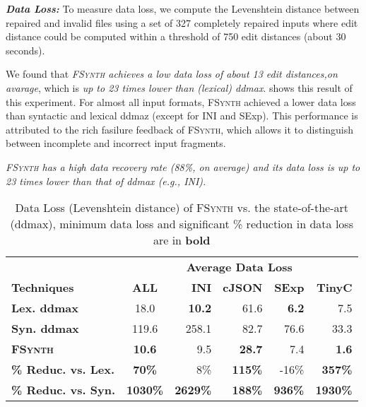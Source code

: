 \documentclass[sigconf,review,anonymous]{acmart}
\newenvironment{result}{\begin{framed}\centering\it}{\end{framed}}
\newcommand{\approach}{\textsc{FSynth}\xspace}
\begin{document}
\noindent
\textbf{\textit{Data Loss:}} To measure data loss, we compute the Levenshtein distance between repaired and invalid files using %
a set of 327 completely repaired inputs %
where edit distance could be computed within a threshold of 750 edit distances (about 30 seconds).

We found that \textit{\approach achieves a low data loss of about 13 edit distances,on avarage},  which is \textit{up to 23 times lower than (lexical) ddmax}.  shows this result of this experiment. For almost all input formats, \approach achieved a lower data loss than syntactic and lexical ddmaz (except for INI and SExp). This performance is attributed to the rich fasilure feedback of \approach, which allows it to distinguish between incomplete and incorrect input fragments.

\begin{result}
\approach has a high data recovery rate (88\%, on average) and its data %
loss is up to 23 times lower than that of ddmax (e.g., INI).
\end{result}


\begin{table}[!tbp]\centering
\caption{Data Loss (Levenshtein distance) of \approach vs. the state-of-the-art (ddmax), minimum data loss and significant \% reduction in data loss are in \textbf{bold}}
\begin{tabular}{|l | c | r  r  r  r |}
\hline
&  \multicolumn{5}{c|}{\textbf{Average Data Loss }}  \\
\textbf{Techniques} & \textbf{ALL} & \textbf{INI} & \textbf{cJSON} & \textbf{SExp} & \textbf{TinyC} \\
\hline
\textbf{Lex. ddmax} & 18.0 & \textbf{10.2} &	61.6 &	\textbf{6.2} &	 7.5 \\	
\textbf{Syn. ddmax} & 119.6 &  258.1 & 82.7 &	76.6 &	33.3 \\
\textbf{\approach} & \textbf{10.6}  & 9.5 &	\textbf{28.7} &	7.4 & \textbf{1.6} \\
\hline
\textbf{\% Reduc. vs. Lex.} & \textbf{70\%} &  8\% & \textbf{115\%} & -16\% & \textbf{357\%} \\
\textbf{\% Reduc. vs. Syn.} & \textbf{1030\%} & \textbf{2629\%} &	\textbf{188\%} & \textbf{936\%} &\textbf{ 1930\%} \\
\hline
\end{tabular}
\label{tab:data-loss}
\end{table}
\end{document}
